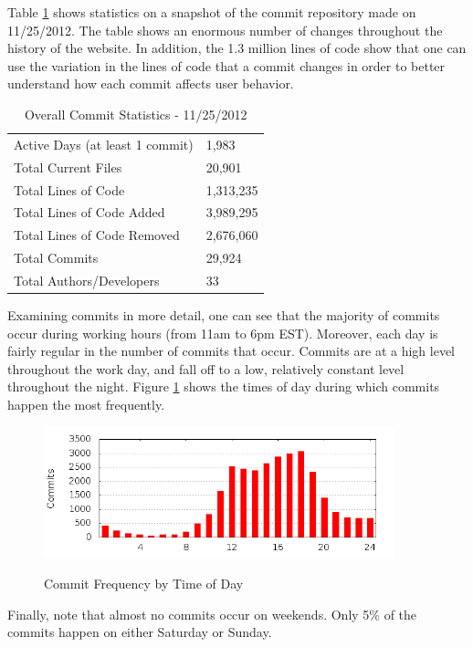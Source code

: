 \documentclass[12pt]{article}
\begin{document}
Table \ref{table:commit-stats} shows statistics on a snapshot of the commit repository made on 11/25/2012. The table shows an enormous number of changes throughout the history of the website. In addition, the 1.3 million lines of code show that one can use the variation in the lines of code that a commit changes in order to better understand how each commit affects user behavior.

\begin{table}[h!]
\centering
\caption{Overall Commit Statistics - 11/25/2012}
\begin{tabular}{l || l }
\hline
Active Days (at least 1 commit) & 1,983 \\
Total Current Files & 20,901 \\
Total Lines of Code & 1,313,235 \\
Total Lines of Code Added & 3,989,295 \\
Total Lines of Code Removed & 2,676,060 \\
Total Commits & 29,924 \\
Total Authors/Developers & 33 \\
\hline
\end{tabular}
\label{table:commit-stats}
\end{table}

Examining commits in more detail, one can see that the majority of commits occur during working hours (from 11am to 6pm EST). Moreover, each day is fairly regular in the number of commits that occur. Commits are at a high level throughout the work day, and fall off to a low, relatively constant level throughout the night. Figure \ref{fig:commit-hours} shows the times of day during which commits happen the most frequently. 

\begin{figure}[h!]
\centering
\caption{Commit Frequency by Time of Day}
\includegraphics[width=4in]{pictures/commit-hours.png}
\label{fig:commit-hours}
\end{figure}

Finally, note that almost no commits occur on weekends. Only 5\% of the commits happen on either Saturday or Sunday.
\end{document}
